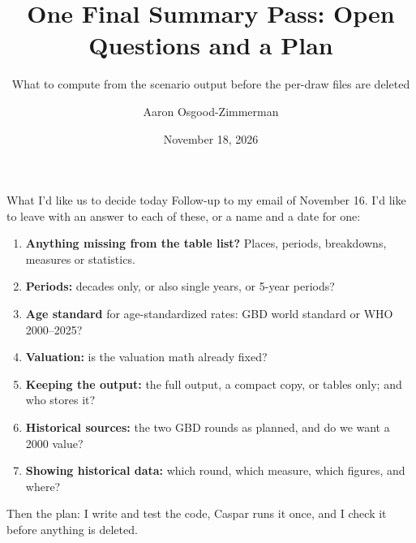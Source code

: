 \documentclass[aspectratio=169,11pt]{beamer}
\title{One Final Summary Pass: Open Questions and a Plan}
\subtitle{What to compute from the scenario output before the per-draw files are deleted}
\author{Aaron Osgood-Zimmerman}
\institute{OZ Labs, for the World Bank}
\date{November 18, 2026}
\begin{document}
\begin{frame}
  \titlepage
\end{frame}

\begin{frame}{What I'd like us to decide today}
  \small
  Follow-up to my email of November 16. I'd like to leave with an answer to each of these, or a name and a date for one:
  \begin{enumerate}
    \item \textbf{Anything missing from the table list?} Places, periods, breakdowns, measures or statistics.
    \item \textbf{Periods:} decades only, or also single years, or 5-year periods?
    \item \textbf{Age standard} for age-standardized rates: GBD world standard or WHO 2000--2025?
    \item \textbf{Valuation:} is the valuation math already fixed?
    \item \textbf{Keeping the output:} the full output, a compact copy, or tables only; and who stores it?
    \item \textbf{Historical sources:} the two GBD rounds as planned, and do we want a 2000 value?
    \item \textbf{Showing historical data:} which round, which measure, which figures, and where?
  \end{enumerate}
  \medskip
  Then the plan: I write and test the code, Caspar runs it once, and I check it before anything is deleted.
\end{frame}
\end{document}
